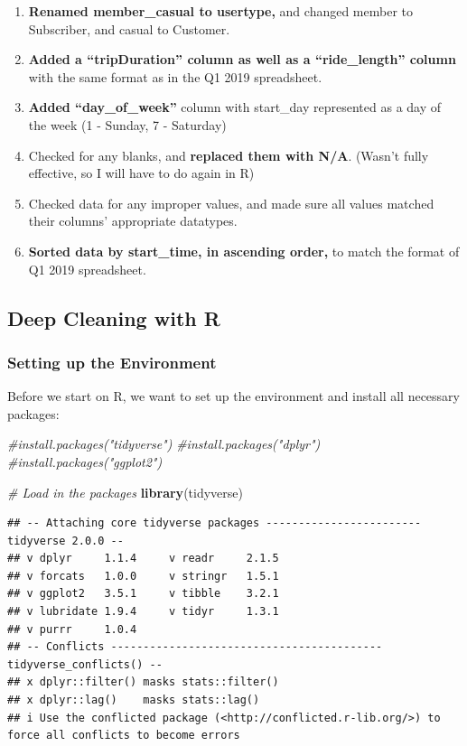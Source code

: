 \documentclass[
]{article}
\newenvironment{Shaded}{\begin{snugshade}}{\end{snugshade}}
\newcommand{\CommentTok}[1]{\textcolor[rgb]{0.56,0.35,0.01}{\textit{#1}}}
\newcommand{\FunctionTok}[1]{\textcolor[rgb]{0.13,0.29,0.53}{\textbf{#1}}}
\newcommand{\NormalTok}[1]{#1}
\begin{document}
\begin{enumerate}
\def\labelenumi{\arabic{enumi}.}
\item
  \textbf{Renamed member\_casual to usertype,} and changed member to
  Subscriber, and casual to Customer.
\item
  \textbf{Added a ``tripDuration'' column as well as a ``ride\_length''
  column} with the same format as in the Q1 2019 spreadsheet.
\item
  \textbf{Added ``day\_of\_week''} column with start\_day represented as
  a day of the week (1 - Sunday, 7 - Saturday)
\item
  Checked for any blanks, and \textbf{replaced them with N/A}. (Wasn't
  fully effective, so I will have to do again in R)
\item
  Checked data for any improper values, and made sure all values matched
  their columns' appropriate datatypes.
\item
  \textbf{Sorted data by start\_time, in ascending order,} to match the
  format of Q1 2019 spreadsheet.
\end{enumerate}

\subsection{Deep Cleaning with R}\label{deep-cleaning-with-r}

\subsubsection{Setting up the
Environment}\label{setting-up-the-environment}

Before we start on R, we want to set up the environment and install all
necessary packages:

\begin{Shaded}
\begin{Highlighting}[]
\CommentTok{\#install.packages("tidyverse")}
\CommentTok{\#install.packages("dplyr")}
\CommentTok{\#install.packages("ggplot2")}

\CommentTok{\# Load in the packages}
\FunctionTok{library}\NormalTok{(tidyverse)}
\end{Highlighting}
\end{Shaded}

\begin{verbatim}
## -- Attaching core tidyverse packages ------------------------ tidyverse 2.0.0 --
## v dplyr     1.1.4     v readr     2.1.5
## v forcats   1.0.0     v stringr   1.5.1
## v ggplot2   3.5.1     v tibble    3.2.1
## v lubridate 1.9.4     v tidyr     1.3.1
## v purrr     1.0.4     
## -- Conflicts ------------------------------------------ tidyverse_conflicts() --
## x dplyr::filter() masks stats::filter()
## x dplyr::lag()    masks stats::lag()
## i Use the conflicted package (<http://conflicted.r-lib.org/>) to force all conflicts to become errors
\end{verbatim}
\end{document}
